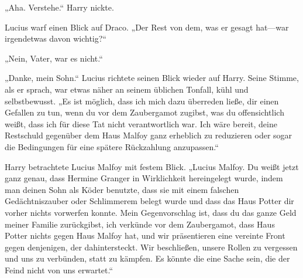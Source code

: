 „Aha. Verstehe.“ Harry nickte.

Lucius warf einen Blick auf Draco. „Der Rest von dem, was er gesagt hat—war irgendetwas davon wichtig?“

„Nein, Vater, war es nicht.“

„Danke, mein Sohn.“ Lucius richtete seinen Blick wieder auf Harry. Seine Stimme, als er sprach, war etwas näher an seinem üblichen Tonfall, kühl und selbstbewusst. „Es ist möglich, dass ich mich dazu überreden ließe, dir einen Gefallen zu tun, wenn du vor dem Zaubergamot zugibst, was du offensichtlich weißt, dass ich für diese Tat nicht verantwortlich war. Ich wäre bereit, deine Restschuld gegenüber dem Haus Malfoy ganz erheblich zu reduzieren oder sogar die Bedingungen für eine spätere Rückzahlung anzupassen.“

Harry betrachtete Lucius Malfoy mit festem Blick.
„Lucius Malfoy. Du weißt jetzt ganz genau, dass Hermine Granger in Wirklichkeit hereingelegt wurde, indem man deinen Sohn als Köder benutzte, dass sie mit einem falschen Gedächtniszauber oder Schlimmerem belegt wurde und dass das Haus Potter dir vorher nichts vorwerfen konnte. Mein Gegenvorschlag ist, dass du das ganze Geld meiner Familie zurückgibst, ich verkünde vor dem Zaubergamot, dass Haus Potter nichts gegen Haus Malfoy hat, und wir präsentieren eine vereinte Front gegen denjenigen, der dahintersteckt. Wir beschließen, unsere Rollen zu vergessen und uns zu verbünden, statt zu kämpfen. Es könnte die eine Sache sein, die der Feind nicht von uns erwartet.“

